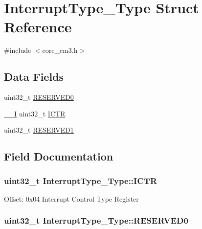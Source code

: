 \hypertarget{structInterruptType__Type}{}\section{Interrupt\+Type\+\_\+\+Type Struct Reference}
\label{structInterruptType__Type}


{\ttfamily \#include $<$core\+\_\+cm3.\+h$>$}

\subsection*{Data Fields}
\begin{DoxyCompactItemize}
\item 
uint32\+\_\+t \hyperlink{structInterruptType__Type_ae0d588643b0488fce4c0a90b85edf362}{R\+E\+S\+E\+R\+V\+E\+D0}
\item 
\hyperlink{LPC17xx_8h_af63697ed9952cc71e1225efe205f6cd3}{\+\_\+\+\_\+I} uint32\+\_\+t \hyperlink{structInterruptType__Type_a2b10f6d37363a6b798ac97f4c4db1e63}{I\+C\+TR}
\item 
uint32\+\_\+t \hyperlink{structInterruptType__Type_a45933eb981309d50f943ec3af67f17be}{R\+E\+S\+E\+R\+V\+E\+D1}
\end{DoxyCompactItemize}


\subsection{Field Documentation}
\subsubsection[{\texorpdfstring{I\+C\+TR}{ICTR}}]{ uint32\+\_\+t Interrupt\+Type\+\_\+\+Type\+::\+I\+C\+TR}\hypertarget{structInterruptType__Type_a2b10f6d37363a6b798ac97f4c4db1e63}{}\label{structInterruptType__Type_a2b10f6d37363a6b798ac97f4c4db1e63}
Offset\+: 0x04 Interrupt Control Type Register 
\subsubsection[{\texorpdfstring{R\+E\+S\+E\+R\+V\+E\+D0}{RESERVED0}}]{\setlength{\rightskip}{0pt plus 5cm}uint32\+\_\+t Interrupt\+Type\+\_\+\+Type\+::\+R\+E\+S\+E\+R\+V\+E\+D0}\hypertarget{structInterruptType__Type_ae0d588643b0488fce4c0a90b85edf362}{}\label{structInterruptType__Type_ae0d588643b0488fce4c0a90b85edf362}
